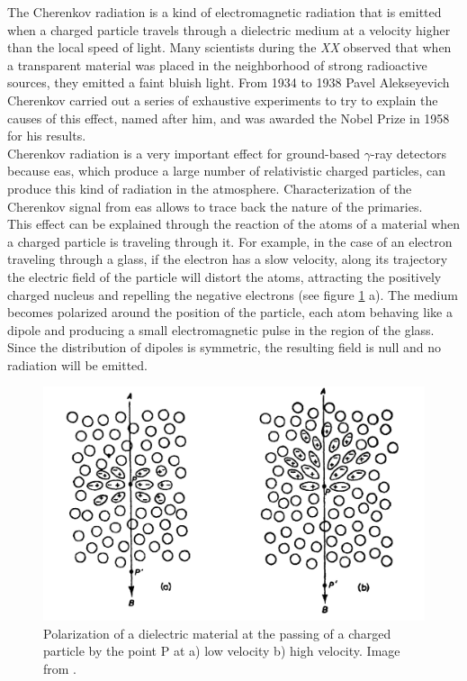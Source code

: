 \documentclass[main.tex]{subfiles}
\begin{document}
The Cherenkov radiation is a kind of electromagnetic radiation that is emitted when a charged particle travels through a dielectric medium at a velocity higher than the local speed of light. Many scientists during the \textit{XX}  observed that when a transparent material was placed in the neighborhood of strong radioactive sources, they emitted a faint bluish light. From 1934 to 1938 Pavel Alekseyevich Cherenkov carried out a series of exhaustive experiments to try to explain the causes of this effect, named after him, and was awarded the Nobel Prize in 1958 for his results.\\
Cherenkov radiation is a very important effect for ground-based $\gamma$-ray detectors because \gls{eas}, which produce a large number of relativistic charged particles, can produce this kind of radiation in the atmosphere. Characterization of the Cherenkov signal from \gls{eas} allows to trace back the nature of the primaries.\\
This effect can be explained through the reaction of the atoms of a material when a charged particle is traveling through it. For example, in the case of an electron traveling through a glass, if the electron has a slow velocity, along its trajectory the electric field of the particle will distort the atoms, attracting the positively charged nucleus and repelling the negative electrons (see figure \ref{fig:polarization} a). The medium becomes polarized around the position of the particle, each atom behaving like a dipole and producing a small electromagnetic pulse in the region of the glass. Since the distribution of dipoles is symmetric,  the resulting field is null and no radiation will be emitted.

\begin{figure}[h]
  \centering
  \includegraphics[width=1\textwidth]{Pictures/polarization.pdf}
  \caption{Polarization of a dielectric material at the passing of a charged particle by the point P at a) low velocity b) high velocity. Image from \cite{jelley1958Cherenkov}.}
  \label{fig:polarization}
\end{figure}
\end{document}
